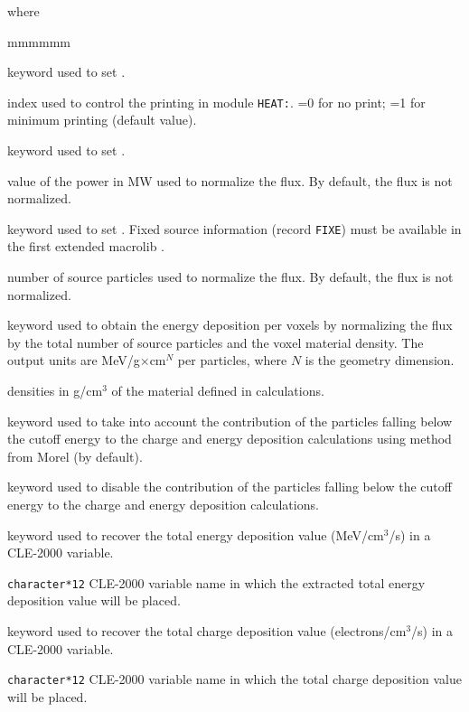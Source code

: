 \noindent where
\begin{ListeDeDescription}{mmmmmm}

\item[\moc{EDIT}] keyword used to set .

\item[\dusa{iprint}] index used to control the printing in module {\tt HEAT:}. =0 for no print; =1 for minimum printing (default value).

\item[\moc{POWR}] keyword used to set .

\item[\dusa{power}] value of the power in MW used to normalize the flux. By default, the flux is not normalized.

\item[\moc{SOUR}] keyword used to set . Fixed source information (record {\tt FIXE}) must be available in the first extended macrolib .

\item[\dusa{snumb}] number of source particles used to normalize the flux. By default, the flux is not normalized.

\item[\moc{NORM}] keyword used to obtain the energy deposition per voxels by normalizing the flux by the total number of source particles and the voxel material density. The output units are MeV/g$\times$cm$^{N}$ per particles, where $N$ is the geometry dimension.

\item[\dusa{rho}] densities in g/cm$^{3}$ of the  material defined in calculations.

\item[\moc{BC}]  keyword used to take into account the contribution of the particles falling below the cutoff energy to the charge and energy deposition calculations using method from Morel\cite{morel1996} (by default).

\item[\moc{NBC}] keyword used to disable the contribution of the particles falling below the cutoff energy to the charge and energy deposition calculations.

\item[\moc{PICKE}]  keyword used to recover the total energy deposition value (MeV/cm$^{3}$/s) in a CLE-2000 variable.

\item[\dusa{esum}] \texttt{character*12} CLE-2000 variable name in which the extracted total energy deposition value will be placed.

\item[\moc{PICKC}]  keyword used to recover the total charge deposition value (electrons/cm$^{3}$/s) in a CLE-2000 variable.

\item[\dusa{csum}] \texttt{character*12} CLE-2000 variable name in which the total charge deposition value will be placed.

\end{ListeDeDescription}
\clearpage
